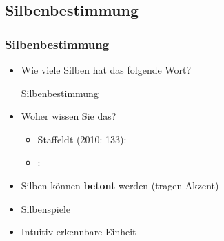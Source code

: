 \subsection{Silbenbestimmung}

\begin{frame}
\frametitle{Silbenbestimmung}

\begin{itemize}
	\item<1-> Wie viele Silben hat das folgende Wort?
	
	  \ea
          Silbenbestimmung
          \z
          
	
	\item<2-> Woher wissen Sie das?
	
	\begin{itemize}
		\item<2-> Staffeldt (2010: 133):\\
		
		\item<2-> \citet[600]{Bussmann02a}:\\
		
	\end{itemize}

	\item<2-> Silben können \textbf{betont} werden (tragen Akzent)
	
	\item<2-> Silbenspiele
	
	\item<2-> Intuitiv erkennbare Einheit

\end{itemize}

\end{frame}



